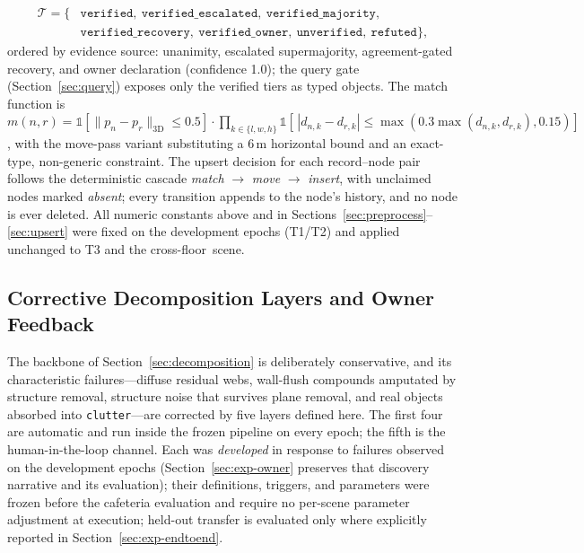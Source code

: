 \documentclass[electronics,article,accept,pdftex,moreauthors]{Definitions/mdpi}
\begin{document}
\[\begin{aligned}\mathcal{T}=\{&\texttt{verified},\ \texttt{verified\_escalated},\ \texttt{verified\_majority},\\
&\texttt{verified\_recovery},\ \texttt{verified\_owner},\ \texttt{unverified},\ \texttt{refuted}\},\end{aligned}\]
ordered by evidence
source: unanimity, escalated supermajority, agreement-gated recovery, and
owner declaration (confidence 1.0); the query gate
(Section~\ref{sec:query}) exposes only the verified tiers as typed objects.
The match function is
$m(n,r)=\mathbb{1}[\lVert p_n-p_r\rVert_{3\mathrm{D}}\le0.5]\cdot
\prod_{k\in\{l,w,h\}}\mathbb{1}[\,|d_{n,k}-d_{r,k}|\le
\max(0.3\max(d_{n,k},d_{r,k}),0.15)]$, with the move-pass variant
substituting a 6\,m horizontal bound and an exact-type, non-generic
constraint. The upsert decision for each record--node pair follows the
deterministic cascade \emph{match} $\rightarrow$ \emph{move} $\rightarrow$
\emph{insert}, with unclaimed nodes marked \emph{absent}; every transition
appends to the node's history, and no node is ever deleted. All numeric
constants above and in
Sections~\ref{sec:preprocess}--\ref{sec:upsert} were fixed on the development
epochs (T1/T2) and applied unchanged to T3 and the cross-\mbox{floor scene}.

\subsection{Corrective Decomposition Layers and Owner Feedback}
\label{sec:corrective}

The backbone of Section~\ref{sec:decomposition} is deliberately conservative,
and its characteristic failures---diffuse residual webs, wall-flush
compounds amputated by structure removal, structure noise that survives
plane removal, and real objects absorbed into \texttt{clutter}---are
corrected by five layers defined here. The first four are automatic and
run inside the frozen pipeline on every epoch; the fifth is the
human-in-the-loop channel. Each was \emph{developed} in response to
failures observed on the development epochs
(Section~\ref{sec:exp-owner} preserves that discovery narrative and its
evaluation); their definitions, triggers, and parameters were frozen
before the cafeteria evaluation and require no per-scene parameter
adjustment at execution; held-out transfer is evaluated only where
explicitly reported in Section~\ref{sec:exp-endtoend}.
\end{document}
